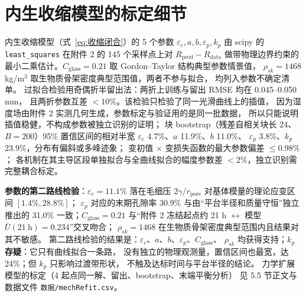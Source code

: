 \documentclass[12pt,a4paper]{ctexart}
\numberwithin{equation}{section}
\begin{document}
\section{内生收缩模型的标定细节}
内生收缩模型（式~\eqref{eq:收缩闭合}）的 5 个参数
$\varepsilon_c,a,b,\varepsilon_p,k_p$ 由 scipy 的 \texttt{least\_squares}
在附件 2 的 145 个采样点上对 $R_{\mathrm{pred}}-R_{\mathrm{data}}$ 做带物理边界约束的
最小二乘估计。$C_{\mathrm{glass}}=0.21$ 取 Gordon--Taylor 结构典型参数情景值，
$\rho_{sk}=1468$ kg/m$^3$ 取生物质骨架密度典型范围值，两者不参与拟合，
均列入参数不确定清单。
过拟合检验用奇偶折半留出法：两折上训练与留出 RMSE 均在 0.045--0.050 mm，
且两折参数互差 $<10\%$。该检验只检验了同一光滑曲线上的插值，
因为湿度场由附件 2 实测几何生成，参数标定与验证用的是同一批数据，
所以只能说明插值稳健，不构成参数被独立识别的证明；
块 bootstrap（残差自相关块长 24、$B=200$）95\%
置信区间的相对半宽 $\varepsilon_c$ 4.7\%、$a$ 11.9\%、$b$ 11.0\%、
$\varepsilon_p$ 3.8\%、$k_p$ 23.9\%，分布有偏斜或多峰迹象；
变初值 $\times$ 变损失函数的最大参数偏差 $\le0.98\%$；
各机制在其主导区段单独拟合与全曲线拟合的幅度参数差 $<2\%$，独立识别需完整耦合标定。

\textbf{参数的第二路线检验}：$\varepsilon_c=11.1\%$ 落在毛细压
$2\gamma/r_{\mathrm{pore}}$ 对基体模量的理论应变区间 $[1.4\%,28.8\%]$；
$\varepsilon_p$ 对应的末期孔隙率 30.9\% 与由“平台半径和质量守恒”独立推出的
31.0\% 一致；$C_{\mathrm{glass}}=0.21$ 与“附件 2 冻结起点约 21 h
$\leftrightarrow$ 模型 $\bar U(21\ \mathrm{h})=0.234$”交叉吻合；
$\rho_{sk}=1468$ 在生物质骨架密度典型范围内且结果对其不敏感。
第二路线检验的结果是：$\varepsilon_c$、$a$、$b$、$\varepsilon_p$、$C_{\mathrm{glass}}$、
$\rho_{sk}$ 均获得支持；\textbf{$k_p$ 存疑}：它只有曲线拟合一条路，
没有独立的物理观测量，置信区间也最宽，达 24\%；但 $k_p$ 只影响过渡带形状，
不触及达标时间与平台半径的结论。
力学扩展模型的标定（4 起点同一解、留出、bootstrap、末端平衡分析）
见 5.5 节正文与数据文件 \texttt{数据/mechRefit.csv}。
\end{document}

